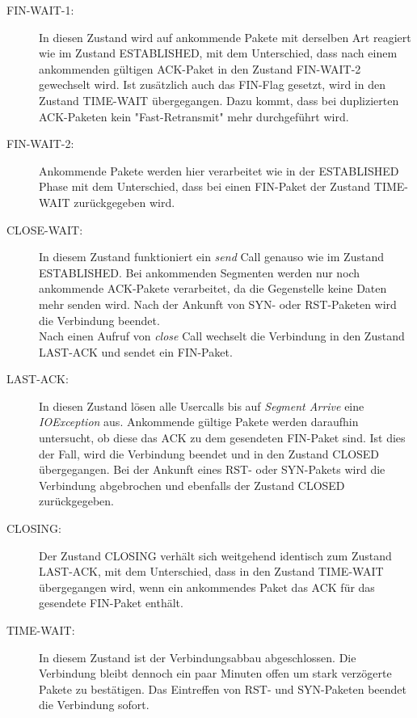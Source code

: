 \begin{description}
\item[FIN-WAIT-1:]

In diesen Zustand wird auf ankommende Pakete mit derselben Art reagiert wie im Zustand ESTABLISHED, mit dem Unterschied, dass nach einem ankommenden gültigen ACK-Paket in den Zustand FIN-WAIT-2 gewechselt wird. Ist zusätzlich auch das FIN-Flag gesetzt, wird in den Zustand TIME-WAIT übergegangen. Dazu kommt, dass bei duplizierten ACK-Paketen kein {}"Fast-Retransmit"{} mehr durchgeführt wird.

\item[FIN-WAIT-2:]	
Ankommende Pakete werden hier verarbeitet wie in der ESTABLISHED Phase mit dem Unterschied, dass bei einen FIN-Paket der Zustand TIME-WAIT zurückgegeben wird.


\item[CLOSE-WAIT:]

In diesem Zustand funktioniert ein \textit{send} Call genauso wie im Zustand ESTABLISHED. Bei ankommenden Segmenten werden nur noch ankommende ACK-Pakete verarbeitet, da die Gegenstelle keine Daten mehr senden wird. Nach der Ankunft von SYN- oder RST-Paketen wird die Verbindung beendet. \\
Nach einen Aufruf von \textit{close} Call wechselt die Verbindung in den Zustand LAST-ACK und sendet ein FIN-Paket.

\item[LAST-ACK:]

In diesen Zustand lösen alle Usercalls bis auf \textit{Segment Arrive} eine \textit{IOException} aus. Ankommende gültige Pakete werden daraufhin untersucht, ob diese das ACK zu dem gesendeten FIN-Paket sind. Ist dies der Fall, wird die Verbindung beendet und in den Zustand CLOSED übergegangen. Bei der Ankunft eines RST- oder SYN-Pakets wird die Verbindung abgebrochen und ebenfalls der Zustand CLOSED zurückgegeben.

\item[CLOSING:]

Der Zustand CLOSING verhält sich weitgehend identisch zum Zustand LAST-ACK, mit dem Unterschied, dass in den Zustand TIME-WAIT übergegangen wird, wenn ein ankommendes Paket das ACK für das gesendete FIN-Paket enthält.


\item[TIME-WAIT:]
In diesem Zustand ist der Verbindungsabbau abgeschlossen. Die Verbindung bleibt dennoch ein paar Minuten offen um stark verzögerte Pakete zu bestätigen. Das Eintreffen von RST- und SYN-Paketen beendet die Verbindung sofort.

\end{description}

